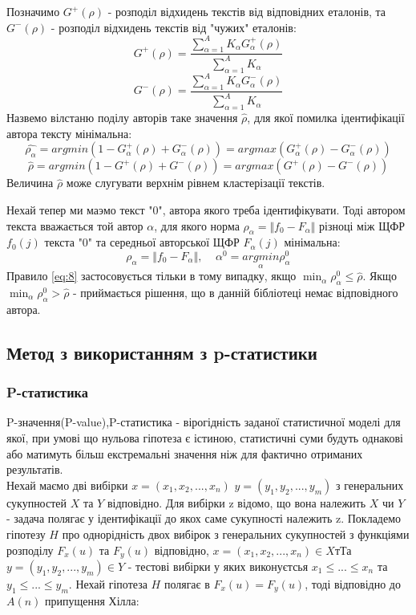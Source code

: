 \documentclass[12pt, a4paper]{extarticle}
\begin{document}
Позначимо $G^+(\rho)$ - розподіл відхидень текстів від відповідних еталонів, та $G^-(\rho)$ - розподіл відхидень текстів від "чужих" еталонів:
\begin{equation}\label{eq:4}
G^+(\rho) = \frac{\sum_{\alpha=1}^{A} K_\alpha G_\alpha^+(\rho)}{\sum_{\alpha=1}^{A} K_\alpha}
\end{equation}
\begin{equation}\label{eq:5}
G^-(\rho) = \frac{\sum_{\alpha=1}^{A} K_\alpha G_\alpha^-(\rho)}{\sum_{\alpha=1}^{A} K_\alpha}
\end{equation}
 Назвемо вілстаню поділу авторів таке значення $\hat{\rho}$, для якої помилка ідентифікації автора тексту мінімальна:
\begin{equation}\label{eq:6}
\hat{\rho_\alpha} = argmin(1 - G_\alpha^+(\rho) + G_\alpha^-(\rho)) = argmax(G_\alpha^+(\rho) - G_\alpha^-(\rho))
\end{equation}
\begin{equation}\label{eq:7}
\hat{\rho} = argmin(1 - G^+(\rho) + G^-(\rho)) = argmax(G^+(\rho) - G^-(\rho))
\end{equation}
Величина $\hat{\rho}$ може слугувати верхнім рівнем кластерізації текстів.

Нехай тепер ми маэмо текст "0", автора якого треба ідентифікувати. Тоді автором текста вважається той автор $\alpha$, для якого норма $\rho_\alpha = \Vert f_0-F_\alpha \Vert$ різноці між ЩФР $f_0(j)$ текста "0" та середньої авторської ЩФР $F_\alpha(j)$ мінімальна:
\begin{equation}\label{eq:8}
\rho_\alpha = \Vert f_0-F_\alpha \Vert, \;\;\;\; \alpha^0 = \underset{\alpha}{argmin} \rho_\alpha^0
\end{equation}
Правило \ref{eq:8} застосовується тільки в тому випадку, якщо $\min_\alpha \rho_\alpha^0 \leq \hat{\rho}$. Якщо $\min_\alpha \rho_\alpha^0 > \hat{\rho}$ - приймається рішення, що в данній бібліотеці немає відповідного автора.

\subsection{Метод з використанням з p-статистики}
\subsubsection{P-статистика}
P-значення(P-value),P-статистика  - вірогідність заданої статистичної моделі для якої, при умові що нульова гіпотеза є істиною, статистичні суми будуть однакові або матимуть більш екстремальні значення ніж для фактично отриманих результатів.\\
Нехай маємо дві вибірки $x=(x_1,x_2,...,x_n)$ $y=(y_1, y_2,...,y_m)$ з генеральних сукупностей $X$ та $Y$ відповідно. Для вибірки z відомо, що вона належить $X$ чи $Y$ - задача полягає у ідентифікації до якох саме сукупності належить z. Покладемо гіпотезу $H$ про однорідність двох вибірок з генеральних сукупностей з функціями розподілу $F_x(u)$ та $F_y(u)$ відповідно, $x=(x_1, x_2, ..., x_n)\in X$тТа $y=(y_1, y_2, ..., y_m)\in Y$ - тестові вибірки у яких виконуєтсья $x_1 \leq ... \leq x_n$ та $y_1 \leq ... \leq y_m$. Нехай гіпотеза $H$ полягає в $F_x(u)=F_y(u)$, тоді відповідно до $A(n)$ припущення Хілла:
\end{document}
